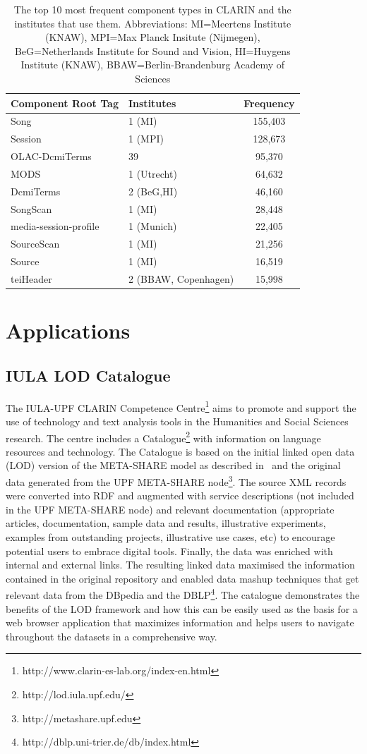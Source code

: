 \documentclass{llncs}
\begin{document}
\begin{table}
\begin{center}
\begin{tabular}{l|lc}
Component Root Tag & Institutes & Frequency \\
\hline
Song & 1 (MI) & 155,403 \\
Session & 1 (MPI) & 128,673 \\
OLAC-DcmiTerms & 39 & 95,370 \\
MODS & 1 (Utrecht)& 64,632 \\
DcmiTerms & 2 (BeG,HI) & 46,160 \\
SongScan & 1 (MI) & 28,448 \\
media-session-profile & 1 (Munich) & 22,405 \\
SourceScan & 1 (MI) & 21,256 \\
Source & 1 (MI) & 16,519 \\
teiHeader & 2 (BBAW, Copenhagen) & 15,998 \\
\end{tabular}
\end{center}
\caption{\label{tab:clarin-types}The top 10 most frequent component types in
CLARIN and the institutes that use them. Abbreviations: MI=Meertens Institute (KNAW),
MPI=Max Planck Insitute (Nijmegen), BeG=Netherlands Institute for Sound and Vision,
HI=Huygens Institute (KNAW), BBAW=Berlin-Brandenburg Academy of Sciences}
\end{table}
\section{Applications}
\label{sec:applications}
\subsection{IULA LOD Catalogue}
\label{sec:iulalod}
The IULA-UPF CLARIN Competence
Centre\footnote{http://www.clarin-es-lab.org/index-en.html} aims to promote and
support the use of technology and text analysis tools in the Humanities and
Social Sciences research. The centre includes a
Catalogue\footnote{http://lod.iula.upf.edu/} with information on language
resources and technology. The Catalogue is based on the initial linked open data
(LOD) version of the META-SHARE model as described in~\cite{Villegas2014} and
the original data generated from the UPF META-SHARE
node\footnote{http://metashare.upf.edu}. The source XML records were converted
into RDF and augmented with service descriptions (not included in the UPF
META-SHARE node) and relevant documentation (appropriate articles,
documentation, sample data and results, illustrative experiments, examples from
outstanding projects, illustrative use cases, etc) to encourage potential users
to embrace digital tools. Finally, the data was enriched with internal and
external links. The resulting linked data maximised the information
contained in the original repository and enabled data mashup techniques that get
relevant data from the DBpedia and the
DBLP\footnote{http://dblp.uni-trier.de/db/index.html}. The catalogue
demonstrates the benefits of the LOD framework and how this can be easily used
as the basis for a web browser application that maximizes information and helps
users to navigate throughout the datasets in a comprehensive way.
\end{document}
